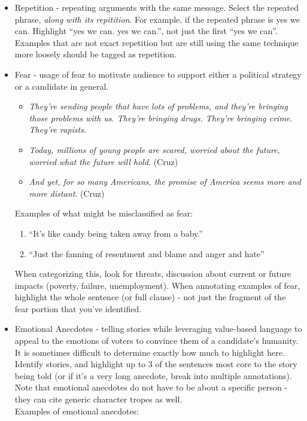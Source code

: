 \documentclass[letterpaper]{article}
\begin{document}
\begin{itemize}
\begin{itemize}
		\end{itemize}
	\item Repetition - repeating arguments with the same message. Select the repeated phrase, \emph{along with its repitition}. For example, if the repeated phrase is yes we can. Highlight ``yes we can. yes we can.'', not just the first ``yes we can''. Examples that are not exact repetition but are still using the same technique more loosely should be tagged as repetition.
	\item Fear - usage of fear to motivate audience to support either a political strategy or a candidate in general.
		\begin{itemize}
			\item \emph{They’re sending people that have lots of problems, and they’re bringing those problems with us. They’re bringing drugs. They’re bringing crime. They’re rapists.}
			\item {\em Today, millions of young people are scared, worried about the future, worried what the future will hold}. (Cruz)
        	\item  {\em And yet, for so many Americans, the promise of America seems more and more distant}. (Cruz)
		\end{itemize}
		Examples of what might be misclassified as fear: \\
		\begin{enumerate}
			\item ``It’s like candy being taken away from a baby.''
			\item ``Just the fanning of resentment and blame and anger and hate''
		\end{enumerate}
		When categorizing this, look for threats, discussion about current or future impacts (poverty, failure, unemployment). When annotating examples of fear, highlight the whole sentence (or full clause) - not just the fragment of the fear portion that you've identified.
	\item Emotional Anecdotes - telling stories while leveraging value-based language to appeal to the emotions of voters to convince them of a candidate's humanity. It is sometimes difficult to determine exactly how much to highlight here. Identify stories, and highlight up to 3 of the sentences most core to the story being told (or if it's a very long anecdote, break into multiple annotations). Note that emotional anecdotes do not have to be about a specific person - they can cite generic character tropes as well. \\
	Examples of emotional anecdotes: \\

\end{itemize}
\end{document}
